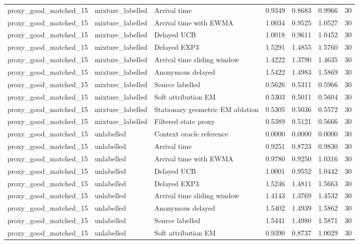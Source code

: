 \begin{tabular}{llllllr}
proxy\_good\_matched\_15 & mixture\_labelled & Arrival time & 0.9349 & 0.8683 & 0.9966 & 30 \\
proxy\_good\_matched\_15 & mixture\_labelled & Arrival time with EWMA & 1.0034 & 0.9525 & 1.0527 & 30 \\
proxy\_good\_matched\_15 & mixture\_labelled & Delayed UCB & 1.0018 & 0.9611 & 1.0452 & 30 \\
proxy\_good\_matched\_15 & mixture\_labelled & Delayed EXP3 & 1.5291 & 1.4855 & 1.5760 & 30 \\
proxy\_good\_matched\_15 & mixture\_labelled & Arrival time sliding window & 1.4222 & 1.3790 & 1.4635 & 30 \\
proxy\_good\_matched\_15 & mixture\_labelled & Anonymous delayed & 1.5422 & 1.4983 & 1.5869 & 30 \\
proxy\_good\_matched\_15 & mixture\_labelled & Source labelled & 0.5626 & 0.5311 & 0.5966 & 30 \\
proxy\_good\_matched\_15 & mixture\_labelled & Soft attribution EM & 0.5303 & 0.5011 & 0.5604 & 30 \\
proxy\_good\_matched\_15 & mixture\_labelled & Stationary geometric EM ablation & 0.5305 & 0.5036 & 0.5572 & 30 \\
proxy\_good\_matched\_15 & mixture\_labelled & Filtered state proxy & 0.5389 & 0.5121 & 0.5666 & 30 \\
proxy\_good\_matched\_15 & unlabelled & Context oracle reference & 0.0000 & 0.0000 & 0.0000 & 30 \\
proxy\_good\_matched\_15 & unlabelled & Arrival time & 0.9251 & 0.8723 & 0.9830 & 30 \\
proxy\_good\_matched\_15 & unlabelled & Arrival time with EWMA & 0.9780 & 0.9250 & 1.0316 & 30 \\
proxy\_good\_matched\_15 & unlabelled & Delayed UCB & 1.0001 & 0.9552 & 1.0442 & 30 \\
proxy\_good\_matched\_15 & unlabelled & Delayed EXP3 & 1.5246 & 1.4811 & 1.5663 & 30 \\
proxy\_good\_matched\_15 & unlabelled & Arrival time sliding window & 1.4143 & 1.3769 & 1.4532 & 30 \\
proxy\_good\_matched\_15 & unlabelled & Anonymous delayed & 1.5402 & 1.4939 & 1.5862 & 30 \\
proxy\_good\_matched\_15 & unlabelled & Source labelled & 1.5441 & 1.4980 & 1.5871 & 30 \\
proxy\_good\_matched\_15 & unlabelled & Soft attribution EM & 0.9390 & 0.8737 & 1.0029 & 30 \\

\end{tabular}
